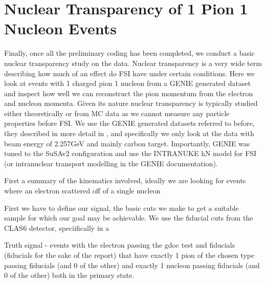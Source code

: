 \documentclass[a4paper,12pt]{article}
\begin{document}
\section{Nuclear Transparency of 1 Pion 1 Nucleon Events}
Finally, once all the preliminary coding has been completed, we conduct a basic nuclear transparency study on the data.
Nuclear transparency is a very wide term describing how much of an effect do FSI have under certain conditions.
Here we look at events with 1 charged pion 1 nucleon from a GENIE generated dataset and inspect how well we can reconstruct the pion momentum from the electron and nucleon momenta.
Given its nature nuclear transparency is typically studied either theoretically or from MC data as we cannot measure any particle properties before FSI.
We use the GENIE generated datasets referred to before, they described in more detail in \cite{papadopoulouLeptonNucleusScatteringMeasurements2023}, and specifically we only look at the data with beam energy of 2.257\si{GeV} and mainly carbon target.
Importantly, GENIE was tuned to the SuSAv2 configuration and use the INTRANUKE hN model for FSI (or intranuclear transport modelling in the GENIE documentation\cite{andreopoulosGENIENeutrinoMonte2015}).


First a summary of the kinematics involved, ideally we are looking for events where an electron scattered off of a single nucleon

First we have to define our signal, the basic cuts we make to get a suitable sample for which our goal may be achievable.
We use the fiducial cuts from the CLAS6 detector, speciifically in a 





Truth signal - events with the electron passing the gdoc test and fiducials (fiducials for the sake of the report) that have exactly 1 pion of the chosen type passing fiducials (and 0 of the other) and exactly 1 nucleon passing fiducials (and 0 of the other) both in the primary state.


\printbibliography
\end{document}
